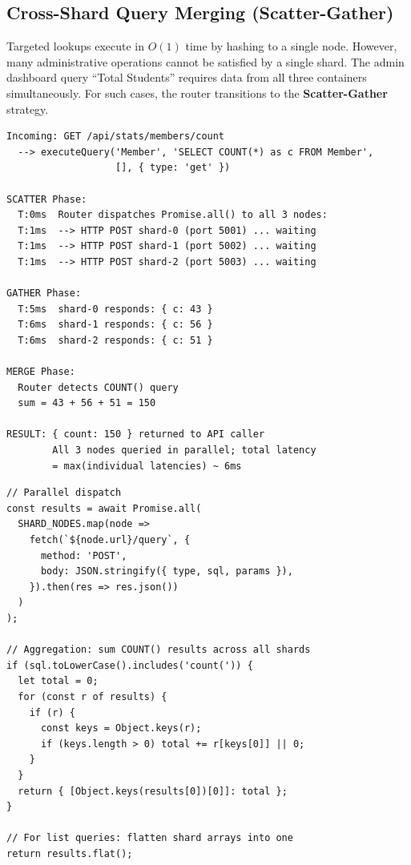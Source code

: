\documentclass[sigconf]{acmart}
\begin{document}
\subsection{Cross-Shard Query Merging (Scatter-Gather)}

Targeted lookups execute in $O(1)$ time by hashing to a single node. However, many administrative operations cannot be satisfied by a single shard. The admin dashboard query ``Total Students'' requires data from all three containers simultaneously. For such cases, the router transitions to the \textbf{Scatter-Gather} strategy.

\begin{lstlisting}[style=logstyle, caption={Scatter-Gather in Action: Admin Dashboard Statistics}]
Incoming: GET /api/stats/members/count
  --> executeQuery('Member', 'SELECT COUNT(*) as c FROM Member',
                   [], { type: 'get' })

SCATTER Phase:
  T:0ms  Router dispatches Promise.all() to all 3 nodes:
  T:1ms  --> HTTP POST shard-0 (port 5001) ... waiting
  T:1ms  --> HTTP POST shard-1 (port 5002) ... waiting
  T:1ms  --> HTTP POST shard-2 (port 5003) ... waiting

GATHER Phase:
  T:5ms  shard-0 responds: { c: 43 }
  T:6ms  shard-1 responds: { c: 56 }
  T:6ms  shard-2 responds: { c: 51 }

MERGE Phase:
  Router detects COUNT() query
  sum = 43 + 56 + 51 = 150

RESULT: { count: 150 } returned to API caller
        All 3 nodes queried in parallel; total latency
        = max(individual latencies) ~ 6ms
\end{lstlisting}

\begin{lstlisting}[style=jsstyle, caption={Scatter-Gather Aggregation Logic (sharding/router.js)}]
// Parallel dispatch
const results = await Promise.all(
  SHARD_NODES.map(node =>
    fetch(`${node.url}/query`, {
      method: 'POST',
      body: JSON.stringify({ type, sql, params }),
    }).then(res => res.json())
  )
);

// Aggregation: sum COUNT() results across all shards
if (sql.toLowerCase().includes('count(')) {
  let total = 0;
  for (const r of results) {
    if (r) {
      const keys = Object.keys(r);
      if (keys.length > 0) total += r[keys[0]] || 0;
    }
  }
  return { [Object.keys(results[0])[0]]: total };
}

// For list queries: flatten shard arrays into one
return results.flat();
\end{lstlisting}
\end{document}
